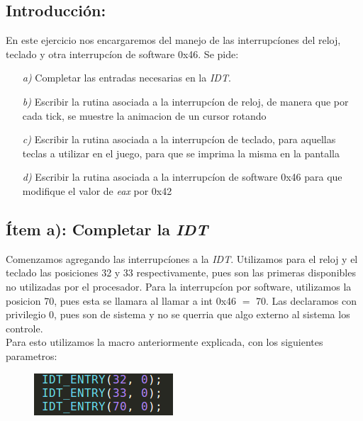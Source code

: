 \subsection{Introducción:}

En este ejercicio nos encargaremos del manejo de las interrupcíones del reloj, teclado y otra interrupcíon de software 0x46. Se pide:

\begin{itemize}
\item [\textit{a)}] Completar las entradas necesarias en la \textit{IDT}.
\item [\textit{b)}] Escribir la rutina asociada a la interrupcíon de reloj, de manera que por cada tick, se muestre la animacion de un cursor rotando
\item [\textit{c)}]  Escribir la rutina asociada a la interrupcíon de teclado, para aquellas teclas a utilizar en el juego, para que se imprima la misma en la pantalla
\item [\textit{d)}] Escribir la rutina asociada a la interrupcíon de software 0x46 para que modifique el valor de \textit{eax} por 0x42
\end{itemize}



\subsection{Ítem a): Completar la \textit{IDT}}

Comenzamos agregando las interrupcíones a la \textit{IDT}. Utilizamos para el reloj y el teclado las posiciones 32 y 33 respectivamente, pues son las primeras disponibles no utilizadas por el procesador. Para la interrupcíon por software, utilizamos la posicion 70, pues esta se llamara al llamar a int 0x46 $=$ 70. Las declaramos con privilegio 0, pues son de sistema y no se querria que algo externo al sistema los controle. \\
Para esto utilizamos la macro anteriormente explicada, con los siguientes parametros:

\begin{figure}[H]
\begin{center}
  \includegraphics[width=\linewidth]{ejercicio5/idt.png}
\endminipage
\end{center}
\end{figure}

